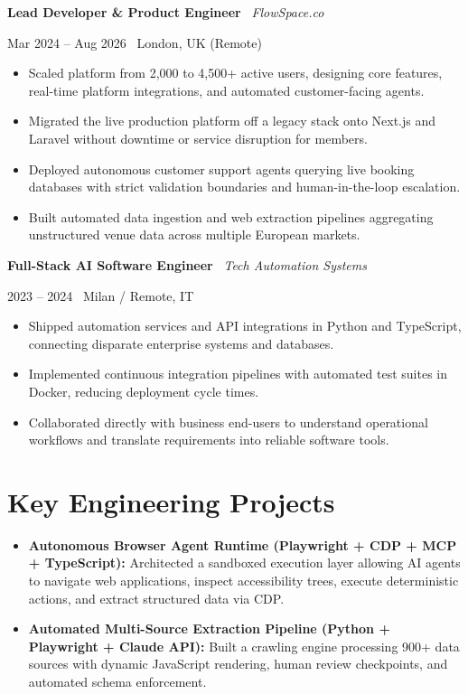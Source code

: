 \documentclass[a4paper,10pt]{article}
\newcommand{\role}[4]{%
  \vspace{2pt}\noindent
  \begin{minipage}[t]{0.70\textwidth}\raggedright\textbf{#1} \textbullet\ \textit{#3}\end{minipage}%
  \hfill
  \begin{minipage}[t]{0.28\textwidth}\raggedleft\footnotesize\color{gray}#2 \textbullet\ #4\end{minipage}%
  \vspace{1pt}%
}
\begin{document}
\vspace{3pt}
\role{Lead Developer \& Product Engineer}{Mar 2024 -- Aug 2026}{FlowSpace.co}{London, UK (Remote)}
\begin{itemize}
  \item Scaled platform from 2,000 to 4,500+ active users, designing core features, real-time platform integrations, and automated customer-facing agents.
  \item Migrated the live production platform off a legacy stack onto Next.js and Laravel without downtime or service disruption for members.
  \item Deployed autonomous customer support agents querying live booking databases with strict validation boundaries and human-in-the-loop escalation.
  \item Built automated data ingestion and web extraction pipelines aggregating unstructured venue data across multiple European markets.
\end{itemize}

\vspace{3pt}
\role{Full-Stack AI Software Engineer}{2023 -- 2024}{Tech Automation Systems}{Milan / Remote, IT}
\begin{itemize}
  \item Shipped automation services and API integrations in Python and TypeScript, connecting disparate enterprise systems and databases.
  \item Implemented continuous integration pipelines with automated test suites in Docker, reducing deployment cycle times.
  \item Collaborated directly with business end-users to understand operational workflows and translate requirements into reliable software tools.
\end{itemize}

\section{Key Engineering Projects}
\begin{itemize}
  \item \textbf{Autonomous Browser Agent Runtime (Playwright + CDP + MCP + TypeScript):} Architected a sandboxed execution layer allowing AI agents to navigate web applications, inspect accessibility trees, execute deterministic actions, and extract structured data via CDP.
  \item \textbf{Automated Multi-Source Extraction Pipeline (Python + Playwright + Claude API):} Built a crawling engine processing 900+ data sources with dynamic JavaScript rendering, human review checkpoints, and automated schema enforcement.
\end{itemize}
\end{document}
